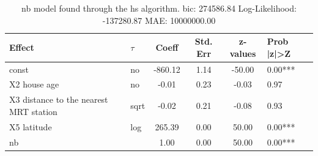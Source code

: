 \begin{table}
	\caption{nb model found through the hs algorithm. bic: 274586.84 Log-Likelihood: -137280.87 MAE: 10000000.00}
	\begin{center}
		\begin{tabular}{|l|l|c|c|c|l|}
			\hline
			Effect & $\tau$ & Coeff & Std. Err & z-values & Prob |z|>Z \\
			\hline
			const & no & -860.12 & 1.14 & -50.00 & 0.00*** \\
			\hline
			X2 house age & no & -0.01 & 0.23 & -0.03 & 0.97 \\
			\hline
			X3 distance to the nearest MRT station & sqrt & -0.02 & 0.21 & -0.08 & 0.93 \\
			\hline
			X5 latitude & log & 265.39 & 0.00 & 50.00 & 0.00*** \\
			\hline
			nb &  & 1.00 & 0.00 & 50.00 & 0.00*** \\
			\hline
		\end{tabular}
	\end{center}
\end{table}